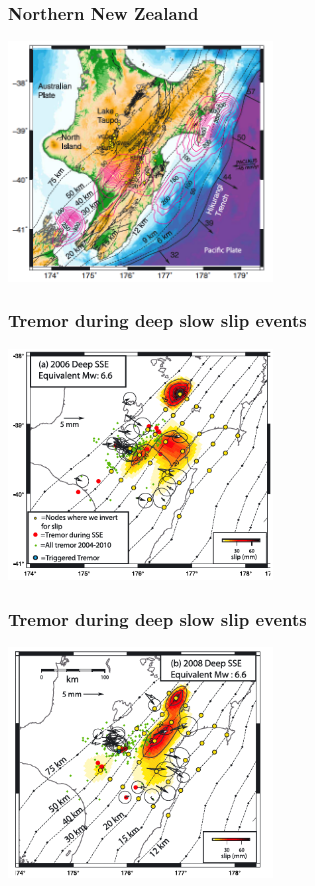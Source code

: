 \documentclass{beamer}
\begin{document}
	\begin{frame}
		\frametitle{Northern New Zealand}
		\begin{center}
			\includegraphics[trim={0cm 0cm 0cm 0cm}, clip, width=7cm]{articles/wallace_eberhart-phillips_2013_1.png}
		\end{center}
	\end{frame}

	\begin{frame}
		\frametitle{Tremor during deep slow slip events}
		\begin{center}
			\includegraphics[trim={0cm 0cm 0cm 0cm}, clip, width=7cm]{articles/wallace_eberhart-phillips_2013_3a.png}
		\end{center}
	\end{frame}

	\begin{frame}
		\frametitle{Tremor during deep slow slip events}
		\begin{center}
			\includegraphics[trim={0cm 0cm 0cm 0cm}, clip, width=7cm]{articles/wallace_eberhart-phillips_2013_3b.png}
		\end{center}
	\end{frame}
\end{document}
